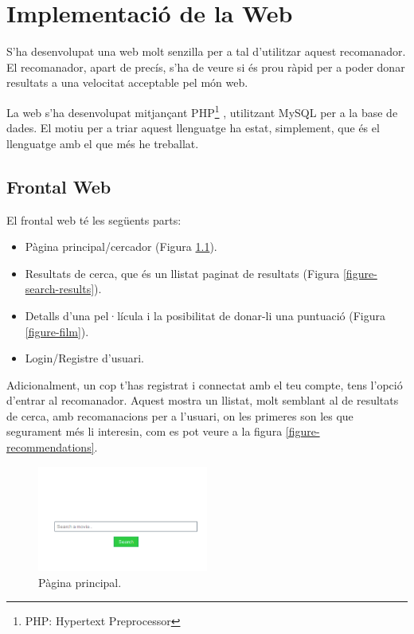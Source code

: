 \chapter{Implementació de la Web}

S'ha desenvolupat una web molt senzilla per a tal d'utilitzar aquest recomanador. El recomanador, apart de precís, s'ha de veure si és prou ràpid per a poder donar resultats a una velocitat acceptable pel món web.

La web s'ha desenvolupat mitjançant PHP\footnote{PHP: Hypertext Preprocessor} \cite{php-web}, utilitzant MySQL \cite{mysql-web} per a la base de dades. El motiu per a triar aquest llenguatge ha estat, simplement, que és el llenguatge amb el que més he treballat.

\section{Frontal Web}

El frontal web té les següents parts:

\begin{itemize}
	\item Pàgina principal/cercador (Figura \ref{figure-homepage}).
	\item Resultats de cerca, que és un llistat paginat de resultats (Figura \ref{figure-search-results}).
	\item Detalls d'una pel·lícula i la posibilitat de donar-li una puntuació (Figura \ref{figure-film}).
	\item Login/Registre d'usuari.
\end{itemize}

Adicionalment, un cop t'has registrat i connectat amb el teu compte, tens l'opció d'entrar al recomanador. Aquest mostra un llistat, molt semblant al de resultats de cerca, amb recomanacions per a l'usuari, on les primeres son les que segurament més li interesin, com es pot veure a la figura \ref{figure-recommendations}.

\begin{figure}[h]
  \caption{Pàgina principal.}
  \label{figure-homepage}
  \centering
    \includegraphics[width=0.5\textwidth]{figs/homepage.png}
\end{figure}


